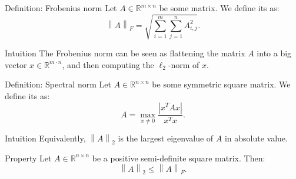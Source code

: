 \documentclass[a4paper]{article}
\begin{document}
\begin{parag}{Definition: Frobenius norm}
    Let $A \in \mathbb{R}^{m \times n}$ be some matrix. We define its  as: 
    \[\left\|A\right\|_F = \sqrt{\sum_{i=1}^{m} \sum_{j=1}^{n} A_{i,j}^2}.\]
    
    \begin{subparag}{Intuition}
        The Frobenius norm can be seen as flattening the matrix $A$ into a big vector $x \in \mathbb{R}^{m\cdot n}$, and then computing the $\ell_2$-norm of $x$.
    \end{subparag}
\end{parag}

\begin{parag}{Definition: Spectral norm}
    Let $A \in \mathbb{R}^{n \times n }$ be some symmetric square matrix. We define its  as: 
    \[A = \max_{x \neq 0} \frac{\left|x^T A x\right|}{x^T x}.\]

    \begin{subparag}{Intuition}
        Equivalently, $\left\|A\right\|_2$ is the largest eigenvalue of $A$ in absolute value.
    \end{subparag}
\end{parag}

\begin{parag}{Property}
    Let $A \in \mathbb{R}^{n \times n}$ be a positive semi-definite square matrix. Then: 
    \[\left\|A\right\|_2 \leq \left\|A\right\|_F.\]
\end{parag}
\end{document}
